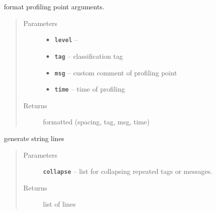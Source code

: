 \documentclass[letterpaper,10pt,english]{sphinxmanual}
\begin{document}
\begin{fulllineitems}
\begin{fulllineitems}
\label{RRtoolbox.lib:RRtoolbox.lib.root.Profiler.formatter}
format profiling point arguments.
\begin{quote}\begin{description}
\item[{Parameters}] \leavevmode\begin{itemize}
\item {} 
\textbf{\texttt{level}} -- 

\item {} 
\textbf{\texttt{tag}} -- classification tag

\item {} 
\textbf{\texttt{msg}} -- custom comment of profiling point

\item {} 
\textbf{\texttt{time}} -- time of profiling

\end{itemize}

\item[{Returns}] \leavevmode
formatted (spacing, tag, msg, time)

\end{description}\end{quote}

\end{fulllineitems}


\begin{fulllineitems}
\label{RRtoolbox.lib:RRtoolbox.lib.root.Profiler.lines_formatted}
generate string lines
\begin{quote}\begin{description}
\item[{Parameters}] \leavevmode
\textbf{\texttt{collapse}} -- list for collapsing repeated tags or messages.

\item[{Returns}] \leavevmode
list of lines

\end{description}\end{quote}

\end{fulllineitems}



\end{fulllineitems}
\end{document}
